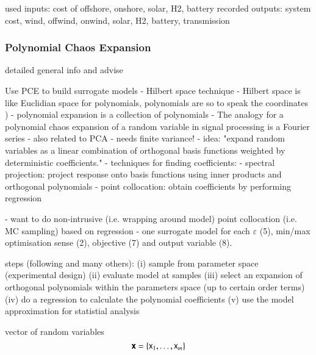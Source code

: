 used inputs: cost of offshore, onshore, solar, H2, battery
recorded outputs: system cost, wind, offwind, onwind, solar, H2, battery, transmission

\subsubsection{Polynomial Chaos Expansion}

detailed general info and advise
\cite{gratiet_metamodel-based_2015} 
\cite{sudret_global_2008}
\cite{fajraoui_optimal_2017}
\cite{marelli_uqlab_nodate}

Use PCE to build surrogate models \cite{sudret_global_2008}
- Hilbert space technique 
- Hilbert space is like Euclidian space for polynomials, polynomials are so to speak the coordinates \cite{gratiet_metamodel-based_2015})
- polynomial expansion is a collection of polynomials
- The analogy for a polynomial chaos expansion of a random variable in signal processing is a Fourier series \cite{muhlpfordt_uncertainty_2020}
- also related to PCA
- needs finite variance!
- idea: "expand random variables as a linear combination of orthogonal basis functions weighted by deterministic coefficients." \cite{muhlpfordt_uncertainty_2020}
- techniques for finding coefficients:
  - spectral projection: project response onto basis functions using inner products and orthogonal polynomials \cite{palar_multi-fidelity_2016}
  - point collocation: obtain coefficients by performing regression \cite{palar_multi-fidelity_2016,fajraoui_optimal_2017}

- want to do non-intrusive (i.e. wrapping around model) point collocation (i.e. MC sampling) based on regression \cite{ng_multifidelity_2012}
- one surrogate model for each $\varepsilon$ (5), min/max optimisation sense (2), objective (7) and output variable (8).

steps (following \cite{feinberg_chaospy_2015} and many others):
(i) sample from parameter space (experimental design)
(ii) evaluate model at samples
(iii) select an expansion of orthogonal polynomials within the parameters space (up to certain order terms)
(iv) do a regression to calculate the polynomial coefficients
(v) use the model approximation for statistial analysis


vector of random variables
\begin{equation}
    \boldsymbol{\mathsf{x}} = \{\mathsf{x}_1, \dots , \mathsf{x}_m\}
\end{equation}

